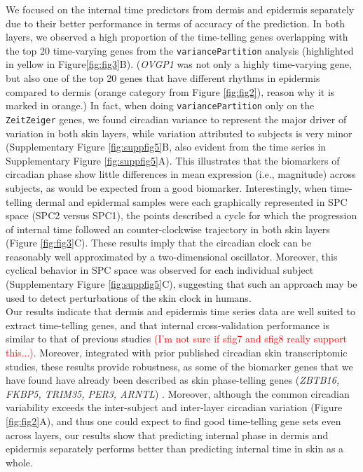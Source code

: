 We focused on the internal time predictors from dermis and epidermis separately due to their better performance in terms of accuracy of the prediction. In both layers, we observed a high proportion of the time-telling genes overlapping with the top 20 time-varying genes from the \texttt{variancePartition} analysis (highlighted in yellow in Figure\ref{fig:fig3}B). (\textit{OVGP1} was not only a highly time-varying gene, but also one of the top 20 genes that have different rhythms in epidermis compared to dermis (orange category from Figure \ref{fig:fig2}), reason why it is marked in orange.) In fact, when doing \texttt{variancePartition} only on the \texttt{ZeitZeiger} genes, we found circadian variance to represent the major driver of variation in both skin layers, while variation attributed to subjects is very minor (Supplementary Figure \ref{fig:suppfig5}B, also evident from the time series in Supplementary Figure \ref{fig:suppfig5}A). This illustrates that the biomarkers of circadian phase show little differences in mean expression (i.e., magnitude) across subjects, as would be expected from a good biomarker. Interestingly, when time-telling dermal and epidermal samples were each graphically represented in SPC space (SPC2 versus SPC1), the points described a cycle for which the progression of internal time followed an counter-clockwise trajectory in both skin layers (Figure \ref{fig:fig3}C). These results imply that the circadian clock can be reasonably well approximated by a two-dimensional oscillator. Moreover, this cyclical behavior in SPC space was observed for each individual subject (Supplementary Figure \ref{fig:suppfig5}C), suggesting that such an approach may be used to detect perturbations of the skin clock in humans. \\

Our results indicate that dermis and epidermis time series data are well suited to extract time-telling genes, and that internal cross-validation performance is similar to that of previous studies \cite{Wu2018, Wu2020} \textcolor{red}{(I'm not sure if sfig7 and sfig8 really support this...)}. Moreover, integrated with prior published circadian skin transcriptomic studies, these results provide robustness, as some of the biomarker genes that we have found have already been described as skin phase-telling genes (\textit{ZBTB16, FKBP5, TRIM35, PER3, ARNTL}) \cite{Wu2018, Wu2020}. Moreover, although the common circadian variability exceeds the inter-subject and inter-layer circadian variation (Figure \ref{fig:fig2}A), and thus one could expect to find good time-telling gene sets even across layers, our results show that predicting internal phase in dermis and epidermis separately performs better than predicting internal time in skin as a whole. \\

